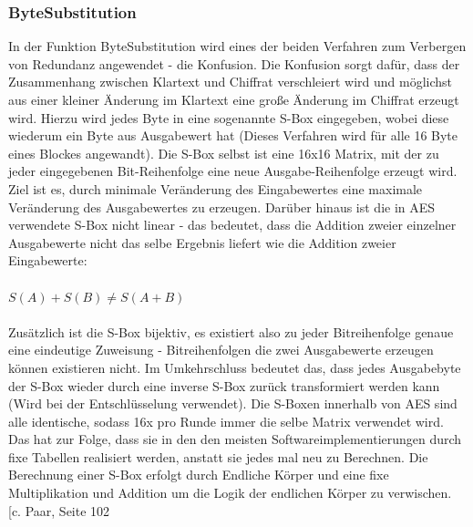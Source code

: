 \documentclass[10pt, a4paper,headsepline]{scrreprt}
\begin{document}
\subsubsection{ByteSubstitution}
In der Funktion ByteSubstitution wird eines der beiden Verfahren zum Verbergen von Redundanz angewendet - die Konfusion. Die Konfusion sorgt dafür, dass der Zusammenhang zwischen Klartext und Chiffrat verschleiert wird und möglichst aus einer kleiner Änderung im Klartext eine große Änderung im Chiffrat erzeugt wird. Hierzu wird jedes Byte in eine sogenannte S-Box eingegeben, wobei diese  wiederum ein Byte aus Ausgabewert hat (Dieses Verfahren wird für alle 16 Byte eines Blockes angewandt). Die S-Box selbst ist eine 16x16 Matrix, mit der zu jeder eingegebenen Bit-Reihenfolge eine neue Ausgabe-Reihenfolge erzeugt wird. Ziel ist es, durch minimale Veränderung des Eingabewertes eine maximale Veränderung des Ausgabewertes zu erzeugen. Darüber hinaus ist die in AES verwendete S-Box nicht linear - das bedeutet, dass die Addition zweier einzelner Ausgabewerte nicht das selbe Ergebnis liefert wie die Addition zweier Eingabewerte:\\ \\
\(S(A) + S(B) \neq S(A+B)\) \\ \\
Zusätzlich ist die S-Box bijektiv, es existiert also zu jeder Bitreihenfolge genaue eine eindeutige Zuweisung - Bitreihenfolgen die zwei Ausgabewerte erzeugen können existieren nicht. Im Umkehrschluss bedeutet das, dass jedes Ausgabebyte der S-Box wieder durch eine inverse S-Box zurück transformiert werden kann (Wird bei der Entschlüsselung verwendet). Die S-Boxen innerhalb von AES sind alle identische, sodass 16x pro Runde immer die selbe Matrix verwendet wird. Das hat zur Folge, dass sie in den den meisten Softwareimplementierungen durch fixe Tabellen realisiert werden, anstatt sie jedes mal neu zu Berechnen. Die Berechnung einer S-Box erfolgt durch Endliche Körper und eine fixe Multiplikation und Addition um die Logik der endlichen Körper zu verwischen. [c. Paar, Seite 102 %
\end{document}
